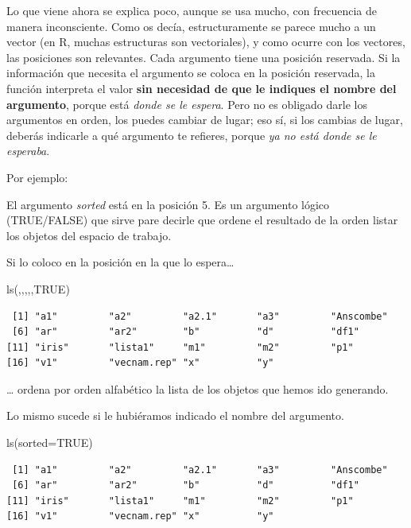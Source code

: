 \documentclass[
  letterpaper,
  DIV=11,
  numbers=noendperiod]{scrreprt}
\newenvironment{Shaded}{\begin{snugshade}}{\end{snugshade}}
\newcommand{\AttributeTok}[1]{\textcolor[rgb]{0.40,0.45,0.13}{#1}}
\newcommand{\ConstantTok}[1]{\textcolor[rgb]{0.56,0.35,0.01}{#1}}
\newcommand{\FunctionTok}[1]{\textcolor[rgb]{0.28,0.35,0.67}{#1}}
\newcommand{\NormalTok}[1]{\textcolor[rgb]{0.00,0.23,0.31}{#1}}
\begin{document}
Lo que viene ahora se explica poco, aunque se usa mucho, con frecuencia
de manera inconsciente. Como os decía, estructuramente se parece mucho a
un vector (en R, muchas estructuras son vectoriales), y como ocurre con
los vectores, las posiciones son relevantes. Cada argumento tiene una
posición reservada. Si la información que necesita el argumento se
coloca en la posición reservada, la función interpreta el valor
\textbf{sin necesidad de que le indiques el nombre del argumento},
porque está \emph{donde se le espera}. Pero no es obligado darle los
argumentos en orden, los puedes cambiar de lugar; eso sí, si los cambias
de lugar, deberás indicarle a qué argumento te refieres, porque \emph{ya
no está donde se le esperaba}.

Por ejemplo:

El argumento \emph{sorted} está en la posición 5. Es un argumento lógico
(TRUE/FALSE) que sirve pare decirle que ordene el resultado de la orden
listar los objetos del espacio de trabajo.

Si lo coloco en la posición en la que lo espera\ldots{}

\begin{Shaded}
\begin{Highlighting}[]
\FunctionTok{ls}\NormalTok{(,,,,,}\ConstantTok{TRUE}\NormalTok{)}
\end{Highlighting}
\end{Shaded}

\begin{verbatim}
 [1] "a1"         "a2"         "a2.1"       "a3"         "Anscombe"  
 [6] "ar"         "ar2"        "b"          "d"          "df1"       
[11] "iris"       "lista1"     "m1"         "m2"         "p1"        
[16] "v1"         "vecnam.rep" "x"          "y"         
\end{verbatim}

\ldots{} ordena por orden alfabético la lista de los objetos que hemos
ido generando.

Lo mismo sucede si le hubiéramos indicado el nombre del argumento.

\begin{Shaded}
\begin{Highlighting}[]
\FunctionTok{ls}\NormalTok{(}\AttributeTok{sorted=}\ConstantTok{TRUE}\NormalTok{)}
\end{Highlighting}
\end{Shaded}

\begin{verbatim}
 [1] "a1"         "a2"         "a2.1"       "a3"         "Anscombe"  
 [6] "ar"         "ar2"        "b"          "d"          "df1"       
[11] "iris"       "lista1"     "m1"         "m2"         "p1"        
[16] "v1"         "vecnam.rep" "x"          "y"         
\end{verbatim}
\end{document}
